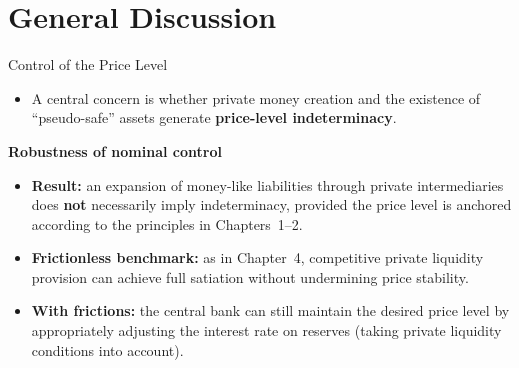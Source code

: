 \documentclass[11pt,aspectratio=169]{beamer}
\begin{document}
\section{General Discussion}
\label{section good equilibrium}

\begin{frame}{Control of the Price Level}
\small
\begin{itemize}
  \item A central concern is whether private money creation and the existence of ``pseudo-safe'' assets generate \textbf{price-level indeterminacy}.
\end{itemize}

\vspace{0.3cm}
\textbf{Robustness of nominal control}
\begin{itemize}
  \item \textbf{Result:} an expansion of money-like liabilities through private intermediaries does \textbf{not} necessarily imply indeterminacy, provided the price level is anchored according to the principles in Chapters~1--2.
  \item \textbf{Frictionless benchmark:} as in Chapter~4, competitive private liquidity provision can achieve full satiation without undermining price stability.
  \item \textbf{With frictions:} the central bank can still maintain the desired price level by appropriately adjusting the interest rate on reserves (taking private liquidity conditions into account).
\end{itemize}
\end{frame}
\end{document}
